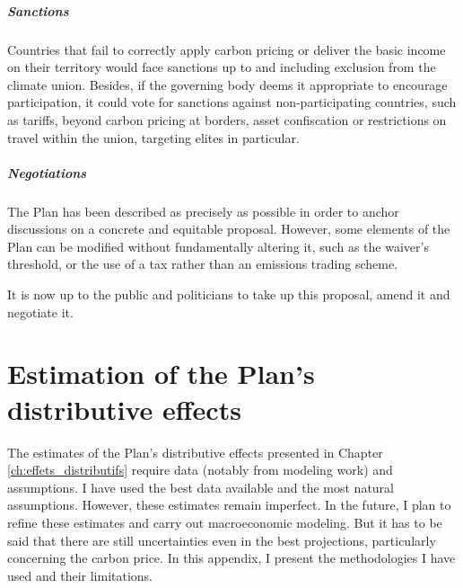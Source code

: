\documentclass[a5paper,english,openany]{memoir}
\begin{document}
\paragraph{Sanctions}

Countries that fail to correctly apply carbon pricing or deliver the basic income on their territory would face sanctions up to and including exclusion from the climate union. %
Besides, if the governing body deems it appropriate to encourage participation, it could vote for sanctions against non-participating countries, such as tariffs, beyond carbon pricing at borders, %
asset confiscation or restrictions on travel within the union, targeting elites in particular. %

\paragraph{Negotiations}

The Plan has been described as precisely as possible in order to anchor discussions on a concrete and equitable proposal. However, some elements of the Plan can be modified without fundamentally altering it, such as the waiver's threshold, or the use of a tax rather than an emissions trading scheme. 

It is now up to the public and politicians to take up this proposal, amend it %
and negotiate it. %



\chapter{Estimation of the Plan's distributive effects}\label{ch:methodo}

The estimates of the Plan's distributive effects presented in Chapter \ref{ch:effets_distributifs} require data (notably from modeling %
work) and assumptions. 
I have used the best data available and the most natural assumptions. However, these estimates remain imperfect. In the future, I plan to refine these estimates and carry out macroeconomic modeling. %
But it has to be said that there are still uncertainties even in the best projections, particularly concerning the carbon price. 
In this appendix, I present the methodologies I have used and their limitations.
\end{document}
